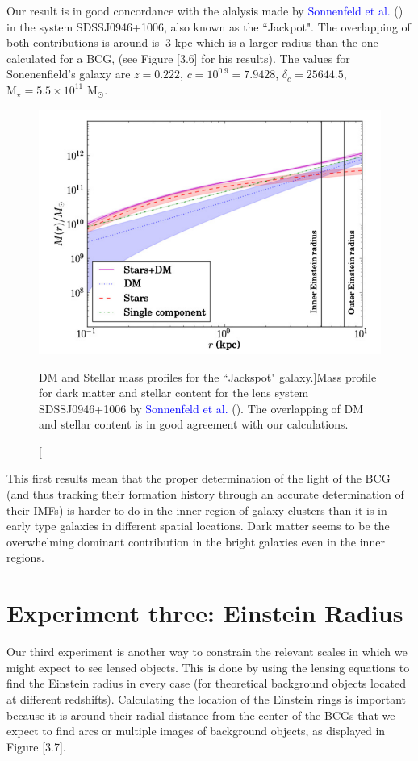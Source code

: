 Our result is in good concordance with the alalysis made by \textcolor{blue}{Sonnenfeld et al.} (\citeyear{Reference15}) in the system SDSSJ0946+1006, also known as the ``Jackpot". The overlapping of both contributions is around is $~3$ kpc which is a larger radius than the one calculated for a BCG, (see Figure [3.6] for his results). The values for Sonenenfield's galaxy are $z=0.222$, $c=10^{0.9}=7.9428$, $\delta_c=25644.5$, $\text{M}_{\star}=5.5\times 10^{11}$ $\text{M}_{\odot}$.

\begin{figure}[H]
\centering
\includegraphics[width=12cm]{images/sonnenfeld_galaxy.png}
\caption[DM and Stellar mass profiles for the ``Jackspot" galaxy.]{Mass profile for dark matter and stellar content for the lens system SDSSJ0946+1006  by \textcolor{blue}{Sonnenfeld et al.} (\citeyear{Reference15}). The overlapping of DM and stellar content is in good agreement with our calculations.}
\end{figure}

This first results mean that the proper determination of the light of the BCG (and thus tracking their formation history through an accurate determination of their IMFs) is harder to do in the inner region of galaxy clusters than it is in early type galaxies in different spatial locations. Dark matter seems to be the overwhelming dominant contribution in the bright galaxies even in the inner regions.

\section{Experiment three: Einstein Radius}

Our third experiment is another way to constrain the relevant scales in which we might expect to see lensed objects. This is done by using the lensing equations to find the Einstein radius in every case (for theoretical background objects located at different redshifts). Calculating the location of the Einstein rings is important because it is around their radial distance from the center of the BCGs that we expect to find arcs or multiple images of background objects, as displayed in Figure [3.7]. 

